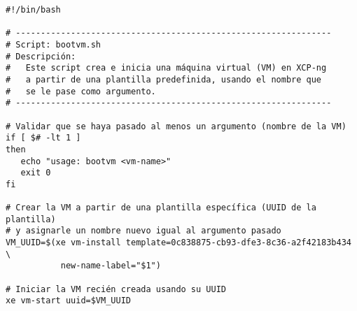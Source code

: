 \begin{verbatim}
#!/bin/bash

# ---------------------------------------------------------------
# Script: bootvm.sh
# Descripción:
#   Este script crea e inicia una máquina virtual (VM) en XCP-ng 
#   a partir de una plantilla predefinida, usando el nombre que 
#   se le pase como argumento.
# ---------------------------------------------------------------

# Validar que se haya pasado al menos un argumento (nombre de la VM)
if [ $# -lt 1 ]
then
   echo "usage: bootvm <vm-name>"
   exit 0
fi

# Crear la VM a partir de una plantilla específica (UUID de la plantilla)
# y asignarle un nombre nuevo igual al argumento pasado
VM_UUID=$(xe vm-install template=0c838875-cb93-dfe3-8c36-a2f42183b434 \
           new-name-label="$1")

# Iniciar la VM recién creada usando su UUID
xe vm-start uuid=$VM_UUID
\end{verbatim}